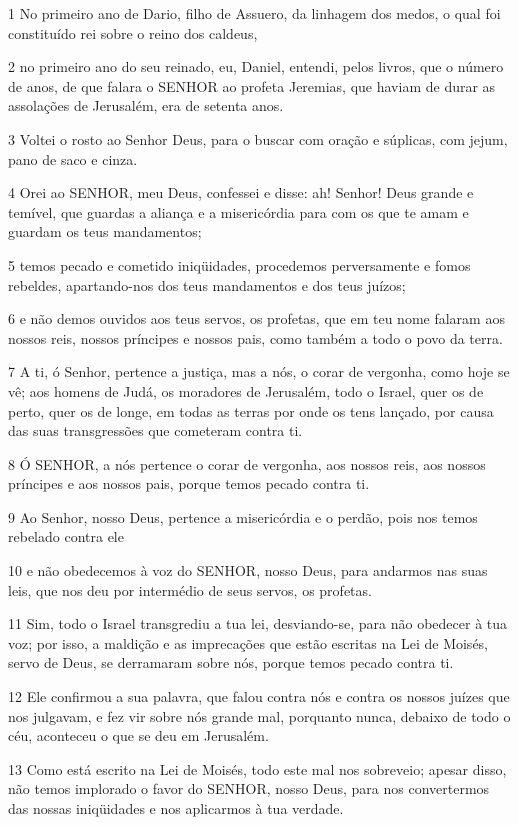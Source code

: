 \par 1 No primeiro ano de Dario, filho de Assuero, da linhagem dos medos, o qual foi constituído rei sobre o reino dos caldeus,
\par 2 no primeiro ano do seu reinado, eu, Daniel, entendi, pelos livros, que o número de anos, de que falara o SENHOR ao profeta Jeremias, que haviam de durar as assolações de Jerusalém, era de setenta anos.
\par 3 Voltei o rosto ao Senhor Deus, para o buscar com oração e súplicas, com jejum, pano de saco e cinza.
\par 4 Orei ao SENHOR, meu Deus, confessei e disse: ah! Senhor! Deus grande e temível, que guardas a aliança e a misericórdia para com os que te amam e guardam os teus mandamentos;
\par 5 temos pecado e cometido iniqüidades, procedemos perversamente e fomos rebeldes, apartando-nos dos teus mandamentos e dos teus juízos;
\par 6 e não demos ouvidos aos teus servos, os profetas, que em teu nome falaram aos nossos reis, nossos príncipes e nossos pais, como também a todo o povo da terra.
\par 7 A ti, ó Senhor, pertence a justiça, mas a nós, o corar de vergonha, como hoje se vê; aos homens de Judá, os moradores de Jerusalém, todo o Israel, quer os de perto, quer os de longe, em todas as terras por onde os tens lançado, por causa das suas transgressões que cometeram contra ti.
\par 8 Ó SENHOR, a nós pertence o corar de vergonha, aos nossos reis, aos nossos príncipes e aos nossos pais, porque temos pecado contra ti.
\par 9 Ao Senhor, nosso Deus, pertence a misericórdia e o perdão, pois nos temos rebelado contra ele
\par 10 e não obedecemos à voz do SENHOR, nosso Deus, para andarmos nas suas leis, que nos deu por intermédio de seus servos, os profetas.
\par 11 Sim, todo o Israel transgrediu a tua lei, desviando-se, para não obedecer à tua voz; por isso, a maldição e as imprecações que estão escritas na Lei de Moisés, servo de Deus, se derramaram sobre nós, porque temos pecado contra ti.
\par 12 Ele confirmou a sua palavra, que falou contra nós e contra os nossos juízes que nos julgavam, e fez vir sobre nós grande mal, porquanto nunca, debaixo de todo o céu, aconteceu o que se deu em Jerusalém.
\par 13 Como está escrito na Lei de Moisés, todo este mal nos sobreveio; apesar disso, não temos implorado o favor do SENHOR, nosso Deus, para nos convertermos das nossas iniqüidades e nos aplicarmos à tua verdade.
